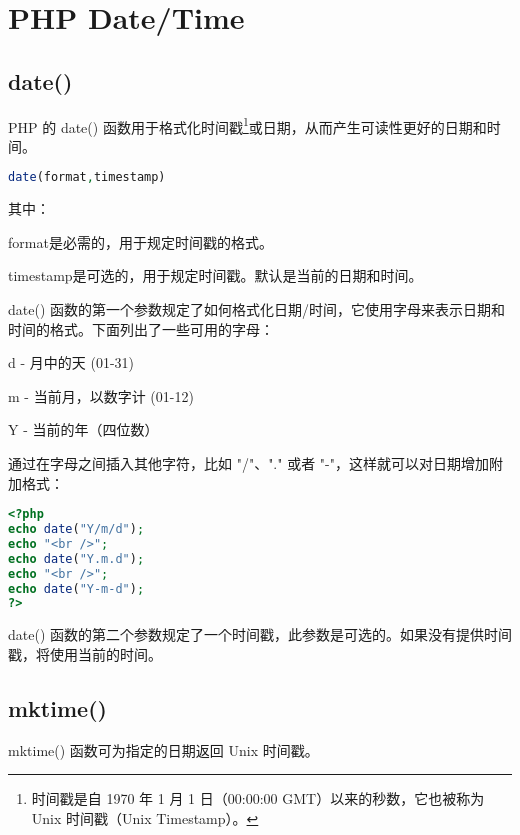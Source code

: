 \chapter{PHP Date/Time}


\section{date()}



PHP 的 date() 函数用于格式化时间戳\footnote{时间戳是自 1970 年 1 月 1 日（00:00:00 GMT）以来的秒数，它也被称为 Unix 时间戳（Unix Timestamp）。}或日期，从而产生可读性更好的日期和时间。

\begin{lstlisting}[language=PHP]
     date(format,timestamp)
\end{lstlisting}

其中：

\begin{compactitem}
\item format是必需的，用于规定时间戳的格式。
\item timestamp是可选的，用于规定时间戳。默认是当前的日期和时间。
\end{compactitem}


date() 函数的第一个参数规定了如何格式化日期/时间，它使用字母来表示日期和时间的格式。下面列出了一些可用的字母：

\begin{compactitem}
\item d - 月中的天 (01-31)
\item m - 当前月，以数字计 (01-12)
\item Y - 当前的年（四位数）
\end{compactitem}

通过在字母之间插入其他字符，比如 "/"、"." 或者 "-"，这样就可以对日期增加附加格式：


\begin{lstlisting}[language=PHP]
<?php
echo date("Y/m/d");
echo "<br />";
echo date("Y.m.d");
echo "<br />";
echo date("Y-m-d");
?>
\end{lstlisting}

date() 函数的第二个参数规定了一个时间戳，此参数是可选的。如果没有提供时间戳，将使用当前的时间。

\section{mktime()}


mktime() 函数可为指定的日期返回 Unix 时间戳。

